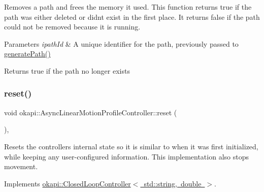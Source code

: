 Removes a path and frees the memory it used. This function returns {\ttfamily true} if the path was either deleted or didn\textquotesingle{}t exist in the first place. It returns {\ttfamily false} if the path could not be removed because it is running.


\begin{DoxyParams}{Parameters}
{\em ipath\+Id} & A unique identifier for the path, previously passed to \mbox{\hyperlink{classokapi_1_1AsyncLinearMotionProfileController_aef2acba51417d929695ca38e309b0f6c}{generate\+Path()}} \\
\hline
\end{DoxyParams}
\begin{DoxyReturn}{Returns}
{\ttfamily true} if the path no longer exists 
\end{DoxyReturn}
\mbox{\label{classokapi_1_1AsyncLinearMotionProfileController_a925381153aeda65c448489a8f2c3803c}} 
\subsubsection{\texorpdfstring{reset()}{reset()}}
{\footnotesize\ttfamily void okapi\+::\+Async\+Linear\+Motion\+Profile\+Controller\+::reset (\begin{DoxyParamCaption}{ }\end{DoxyParamCaption})\hspace{0.3cm}{\ttfamily [override]}, {\ttfamily [virtual]}}

Resets the controller\textquotesingle{}s internal state so it is similar to when it was first initialized, while keeping any user-\/configured information. This implementation also stops movement. 

Implements \mbox{\hyperlink{classokapi_1_1ClosedLoopController_a7dd6ce28b3e38bdf987514a1b6c83c8c}{okapi\+::\+Closed\+Loop\+Controller$<$ std\+::string, double $>$}}.

\mbox{\label{classokapi_1_1AsyncLinearMotionProfileController_a18e3ba77f08cb5dd93a9cba23d4c2a1e}} 

